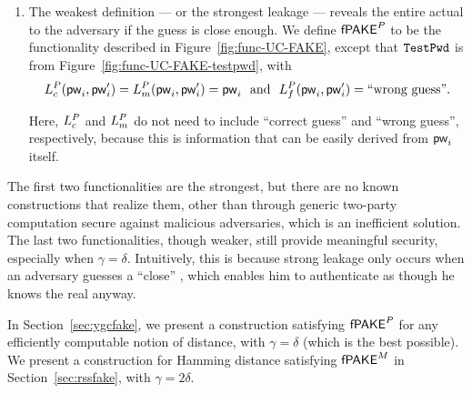 \begin{enumerate}

\item
The weakest definition --- or the strongest leakage --- reveals the entire actual \password to the adversary if the \password guess is close enough.
We define $\textsf{fPAKE}^P$ to be the functionality described in Figure~\ref{fig:func-UC-FAKE}, except that $\texttt{TestPwd}$ is from Figure~\ref{fig:func-UC-FAKE-testpwd}, with 
\[L_{c}^P(\mathsf{pw}_{i}, \mathsf{pw}_{i}') = L_{m}^P(\mathsf{pw}_{i}, \mathsf{pw}_{i}') = \mathsf{pw}_{i}  \mbox{ \ and \ }
L_{f}^P(\mathsf{pw}_{i}, \mathsf{pw}_{i}') = \mbox{``wrong guess''}.\]

Here, $L_{c}^P$ and $L_{m}^P$ do not need to include ``correct guess'' and ``wrong guess'', respectively, because this is information that can be easily derived from $\mathsf{pw}_{i}$ itself.
\end{enumerate}

\noindent
The first two functionalities are the strongest, but there are no known constructions that realize them, other than through generic two-party computation secure against malicious adversaries, which is an inefficient solution.
The last two functionalities, though weaker, still provide meaningful security, especially when $\gamma = \delta$.
Intuitively, this is because strong leakage only occurs when an adversary guesses a ``close'' \password, which enables him to authenticate as though he knows the real \password anyway.

In Section~\ref{sec:ygcfake}, we present a construction satisfying $\textsf{fPAKE}^P$ for any efficiently computable notion of distance, with $\gamma = \delta$ (which is the best possible).
We present a construction for Hamming distance satisfying $\textsf{fPAKE}^M$ in Section~\ref{sec:rssfake}, with $\gamma = 2\delta$. 
